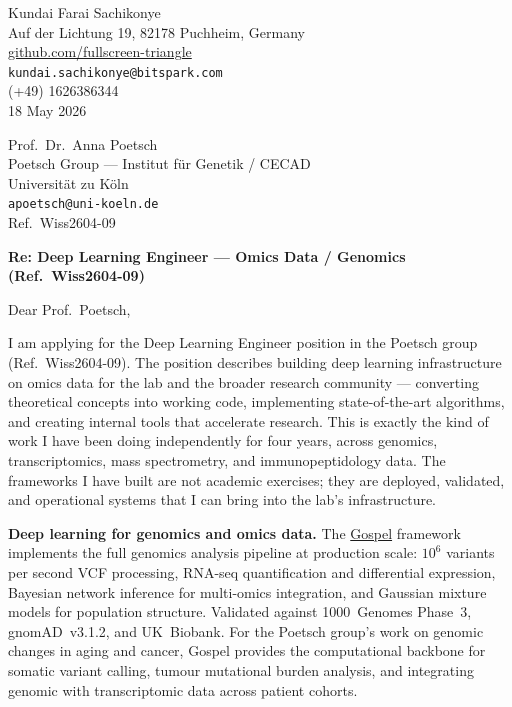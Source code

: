 \documentclass[12pt,a4paper]{article}
\begin{document}
\begin{flushright}
Kundai Farai Sachikonye \\
Auf der Lichtung 19, 82178 Puchheim, Germany \\
\href{https://github.com/fullscreen-triangle}{github.com/fullscreen-triangle} \\
\texttt{kundai.sachikonye@bitspark.com} \\
(+49) 1626386344 \\[6pt]
18 May 2026
\end{flushright}

\vspace{1em}

Prof.\ Dr.\ Anna Poetsch \\
Poetsch Group --- Institut für Genetik / CECAD \\
Universität zu Köln \\
\texttt{apoetsch@uni-koeln.de} \\
Ref.\ Wiss2604-09

\vspace{1.5em}

\textbf{Re: Deep Learning Engineer --- Omics Data / Genomics (Ref.\ Wiss2604-09)}

\vspace{1em}

Dear Prof.\ Poetsch,

I am applying for the Deep Learning Engineer position in the Poetsch group
(Ref.\ Wiss2604-09). The position describes building deep learning
infrastructure on omics data for the lab and the broader research community ---
converting theoretical concepts into working code, implementing state-of-the-art
algorithms, and creating internal tools that accelerate research.
This is exactly the kind of work I have been doing independently for four years,
across genomics, transcriptomics, mass spectrometry, and immunopeptidology data.
The frameworks I have built are not academic exercises; they are deployed,
validated, and operational systems that I can bring into the lab's infrastructure.

\textbf{Deep learning for genomics and omics data.}
The \href{https://github.com/fullscreen-triangle/gospel}{Gospel} framework
implements the full genomics analysis pipeline at production scale:
$10^6$ variants per second VCF processing, RNA-seq quantification and differential
expression, Bayesian network inference for multi-omics integration, and Gaussian
mixture models for population structure.
Validated against 1000~Genomes Phase~3, gnomAD~v3.1.2, and UK~Biobank.
For the Poetsch group's work on genomic changes in aging and cancer, Gospel
provides the computational backbone for somatic variant calling,
tumour mutational burden analysis, and integrating genomic with transcriptomic
data across patient cohorts.
\end{document}
